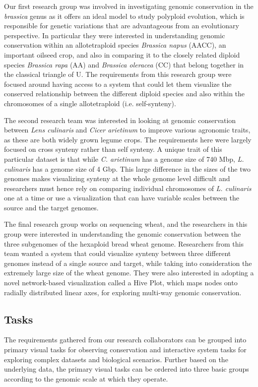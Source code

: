 Our first research group was involved in investigating genomic conservation in the \textit{brassica} genus as it offers an ideal model to study polyploid evolution, which is responsible for genetic variations that are advantageous from an evolutionary perspective\cite{madlung2013polyploidy,liu2014brassica}. In particular they were interested in understanding genomic conservation within an allotetraploid species \textit{Brassica napus} (AACC), an important oilseed crop, and also in comparing it to the closely related diploid species \textit{Brassica rapa} (AA) and \textit{Brassica oleracea} (CC) that belong together in the classical triangle of U\cite{nagaharu1935genome}. The requirements from this research group were focused around having access to a system that could let them visualize the conserved relationship between the different diploid species and also within the chromosomes of a single allotetraploid (i.e. self-synteny). 

The second research team was interested in looking at genomic conservation between \textit{Lens culinaris} and \textit{Cicer arietinum} to improve various agronomic traits, as these are both widely grown legume crops. The requirements here were largely focused on cross synteny rather than self synteny. A unique trait of this particular dataset is that while \textit{C. arietinum} has a genome size of 740 Mbp, \textit{L. culinaris} has a genome size of 4 Gbp. This large difference in the sizes of the two genomes makes visualizing synteny at the whole genome level difficult and researchers must hence rely on comparing individual chromosomes of \textit{L. culinaris} one at a time or use a visualization that can have variable scales between the source and the target genomes.

The final research group works on sequencing wheat, and the researchers in this group were interested in understanding the genomic conservation between the three subgenomes of the hexaploid bread wheat genome. Researchers from this team wanted a system that could visualize synteny between three different genomes instead of a single source and target, while taking into consideration the extremely large size of the wheat genome. They were also interested in adopting a novel network-based visualization called a Hive Plot\cite{krzywinski2011hive}, which maps nodes onto radially distributed linear axes, for exploring multi-way genomic conservation.

\subsection{Tasks}
The requirements gathered from our research collaborators can be grouped into primary visual tasks for observing conservation and interactive system tasks for exploring complex datasets and biological scenarios. Further based on the underlying data, the primary visual tasks can be ordered into three basic groups according to the genomic scale at which they operate.

